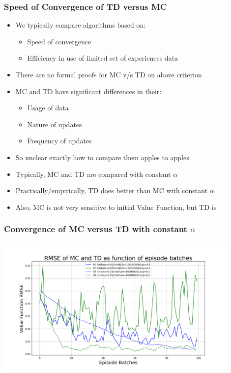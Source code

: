 \documentclass[handout]{beamer}
\begin{document}
\begin{frame}
\frametitle{Speed of Convergence of TD versus MC}
\pause
\begin{itemize}[<+->]
\item We typically compare algorithms based on:
\begin{itemize}[<+->]
\item Speed of convergence
\item Efficiency in use of limited set of experiences data
\end{itemize}
\item There are no formal proofs for MC v/s TD on above criterion
\item MC and TD have significant differences in their:
\begin{itemize}[<+->]
\item Usage of data
\item Nature of updates
\item Frequency of updates
\end{itemize}
\item So unclear exactly how to compare them apples to apples
\item Typically, MC and TD are compared with constant $\alpha$
\item Practically/empirically, TD does better than MC with constant $\alpha$
\item Also, MC is not very sensitive to initial Value Function, but TD is
\end{itemize}
\end{frame}

\begin{frame}
\frametitle{Convergence of MC versus TD with constant $\alpha$}
\includegraphics[width=12cm, height=7cm]{random_walk_mrp_convergence.png}
\end{frame}
\end{document}
